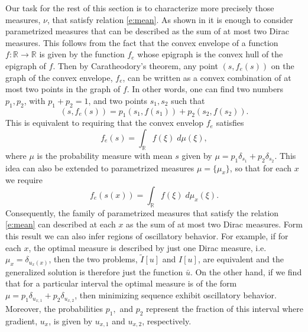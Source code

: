 \documentclass[11pt]{article}
\newcommand{\R}{\mathbb{R}}
\theoremstyle{plain}
\begin{document}
Our task for the rest of this section is to characterize more precisely those measures, $\nu$, that satisfy relation \eqref{e:mean}. As shown in \cite{meziat2006} it is enough to consider parametrized measures that can be described as the sum of at most two Dirac measures. This follows from the fact that the convex envelope of a function $f: \R \rightarrow \R$ is given by the function $f_e$ whose epigraph is the convex hull of the epigraph of $f$. Then by Caratheodory's theorem, any point $(s, f_e(s))$ on the graph of the convex envelope, $f_e$, can be written as a convex combination of at most two points in the graph of $f$. In other words, one can find two numbers $p_1,p_2$, with $p_1+p_2=1$, and two points $s_1, s_2$ such that
\[(s, f_e(s)) = p_1(s_1, f(s_1)) + p_2(s_2, f(s_2)).\]
This is equivalent to requiring that the convex envelop $f_e$ satisfies
\[ f_e(s) = \int_\R f(\xi) \;d\mu(\xi),\]
where  $\mu$ is the probability measure with mean $s$ given by $\mu = p_1\delta_{s_1} +p_2\delta_{s_2}$. This idea can also be extended to parametrized measures $\mu = \{ \mu_x\}$, so that for each $x$ we require
\[ f_e(s(x)) = \int_\R f(\xi) \;d\mu_x(\xi).\]
Consequently, the family of parametrized measures that satisfy the relation \eqref{e:mean} can described at each $x$ as the sum of at most two Dirac measures. Form this result we can also infer regions of oscillatory behavior. For example, if for each $x$, the optimal measure is described by just one Dirac measure, i.e. $\mu_x = \delta_{u_x(x)}$, then the two problems, $\tilde{I}[u]$ and $ I[u]$, are equivalent and the generalized solution is therefore just the function $\bar{u}$. On the other hand, if we find that for a particular interval the optimal measure is of the form $\mu = p_1\delta_{u_{x,1}} +p_2\delta_{u_{x,2}}$, then minimizing sequence exhibit oscillatory behavior. Moreover, the probabilities $p_1,$ and $p_2$ represent the fraction of this interval where gradient, $u_x$, is given by $u_{x,1}$ and $u_{x,2}$, respectively.
\end{document}
